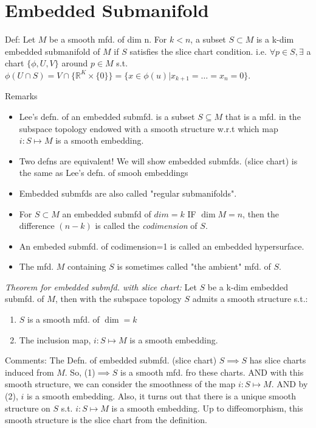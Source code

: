 \documentclass[12pt,letterpaper]{article}
\begin{document}
\section*{Embedded Submanifold}

Def: Let $M$ be a smooth mfd. of dim n. For $k < n$, a subset $S \subset M$ is a k-dim embedded submanifold of $M$ if $S$ satisfies the slice chart condition. i.e. $\forall p \in S, \exists $ a chart $\{\phi, U, V\}$ around $p \in M$ s.t. $\phi (U \cap S) =  V \cap \{ \mathbb{R}^K \times \{0\}\}= \{ x \in \phi(u) | x_{k+1} = \dots = x_n = 0\}$.

Remarks
\begin{itemize}
    \item Lee's defn. of an embedded submfd. is a subset $S \subseteq M$ that is a mfd. in the subspace topology endowed with a smooth structure w.r.t which map $i: S \mapsto M$ is a smooth embedding. 
    \item Two defns are equivalent! We will show embedded submfds. (slice chart) is the same as Lee's defn. of smooh embeddings
    \item Embedded submfds are also called "regular submanifolds".
    \item For $S \subset M$ an embedded submfd of $dim = k$ IF $\dim M = n$, then the difference $(n-k)$ is called the \textit{codimension} of $S$. 
    \item An embeded submfd. of codimension=1 is called an embedded hypersurface.
    \item The mfd. $M$ containing $S$ is sometimes called "the ambient" mfd. of $S$. 
\end{itemize}

\textit{Theorem for embedded submfd. with slice chart:} Let $S$ be a k-dim embedded submfd. of $M$, then with the subspace topology $S$ admits a smooth structure s.t.:
\begin{enumerate}
    \item $S$ is a smooth mfd. of $\dim = k$
    \item The inclusion map, $i: S \mapsto M$ is a smooth embedding.
\end{enumerate}

Comments: The Defn. of embedded submfd. (slice chart) $S \implies S$ has slice charts induced from $M$. So, (1)$\implies S$ is a smooth mfd. fro these charts. AND with this smooth structure, we can consider the smoothness of the map $i: S \mapsto M$. AND by (2), $i$ is a smooth embedding. Also, it turns out that there is a unique smooth structure on $S$ s.t. $i: S \mapsto M$ is a smooth embedding. Up to diffeomorphism, this smooth structure is the slice chart from the definition. 
\end{document}
